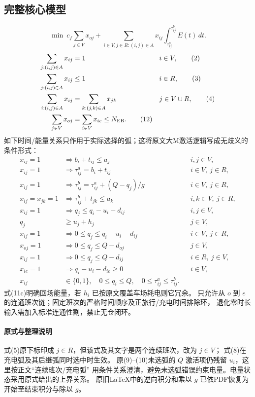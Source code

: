 \documentclass[UTF8,11pt]{ctexart}
\begin{document}
\subsection*{完整核心模型}
\[
\min\ c_f\sum_{j\in V}x_{oj}
 +\sum_{i\in V,j\in R:(i,j)\in A}
  x_{ij}\int_{\tau^a_{ij}}^{\tau^b_{ij}}E(t)\,dt.\tag{1}
\]
\begin{align}
\sum_{j:(i,j)\in A}x_{ij}&=1 &&i\in V,\tag{2}\\
\sum_{j:(i,j)\in A}x_{ij}&\le1 &&i\in R,\tag{3}\\
\sum_{i:(i,j)\in A}x_{ij}&=\sum_{k:(j,k)\in A}x_{jk}
&&j\in V\cup R,\tag{4}\\
\sum_{j\in V}x_{oj}&=\sum_{i\in V}x_{ie}\le N_{\rm EB}.\tag{12}
\end{align}
如下时间/能量关系只作用于实际选择的弧；这将原文大M激活逻辑写成无歧义的条件形式：
\begin{align}
x_{ij}=1&\Longrightarrow b_i+t_{ij}\le a_j &&i,j\in V,\tag{5}\\
x_{ij}=1&\Longrightarrow \tau^a_{ij}=b_i+t_{ij} &&i\in V,\ j\in R,\tag{6}\\
x_{ij}=1&\Longrightarrow \tau^b_{ij}=\tau^a_{ij}+(Q-q_j)/g
&&i\in V,\ j\in R,\tag{7}\\
x_{ij}=x_{jk}=1&\Longrightarrow \tau^b_{ij}+t_{jk}\le a_k
&&i,k\in V,\ j\in R,\tag{8}\\
x_{ij}=1&\Longrightarrow q_j\le q_i-u_i-d_{ij} &&i,j\in V,\tag{9a}\\
q_j&\ge u_j+h_j &&j\in V,\tag{9b}\\
x_{ij}=1&\Longrightarrow 0\le q_j\le q_i-u_i-d_{ij}
&&i\in V,\ j\in R,\tag{10}\\
x_{oj}=1&\Longrightarrow 0\le q_j\le Q-d_{oj} &&j\in V,\tag{11a}\\
x_{ij}=1&\Longrightarrow 0\le q_j\le Q-d_{ij} &&i\in R,\ j\in V,\tag{11b}\\
x_{ie}=1&\Longrightarrow q_i-u_i-d_{ie}\ge0 &&i\in V,\tag{11c}\\
x_{ij}&\in\{0,1\},\quad 0\le q_i\le Q,\quad
0\le\tau^a_{ij}\le\tau^b_{ij}.\tag{13}
\end{align}
式(11c)明确回场能量，若 $h_i$ 已按原文覆盖车场耗电则它冗余。
只允许从 $o$ 到 $e$ 的连通班次链；固定班次的严格时间顺序及正旅行/充电时间排除环，
退化零时长输入需加入标准连通性割，禁止无仓闭环。
\paragraph{原式与整理说明}
式(5)原下标印成 $j\in R$，但该式及其文字是两个连续班次，改为 $j\in V$；
式(8)在充电弧及其后继弧同时选中时生效。
原(9)--(10)未选弧的 $Q$ 激活项仍残留 $u_i$，这里按正文“连续班次/充电弧”
用条件关系澄清，避免未选弧错误约束电量。电量状态采用原式给出的上界关系。
原旧LaTeX中的逆向积分和乘以 $g$ 已依PDF恢复为开始至结束积分与除以 $g$。
\end{document}
